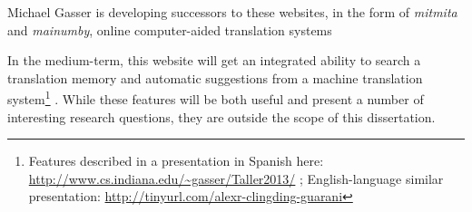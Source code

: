 Michael Gasser is developing successors to these websites, in the form of
\emph{mitmita} and \emph{mainumby}, online computer-aided translation systems

In the medium-term, this website will get an integrated ability to search
a translation memory and automatic suggestions from a machine translation
system\footnote{Features described in a presentation in Spanish here:
\url{http://www.cs.indiana.edu/~gasser/Taller2013/} ; English-language similar
presentation: \url{http://tinyurl.com/alexr-clingding-guarani} }
. While these features will be both useful and present a number of
interesting research questions, they are outside the scope of this
dissertation.
